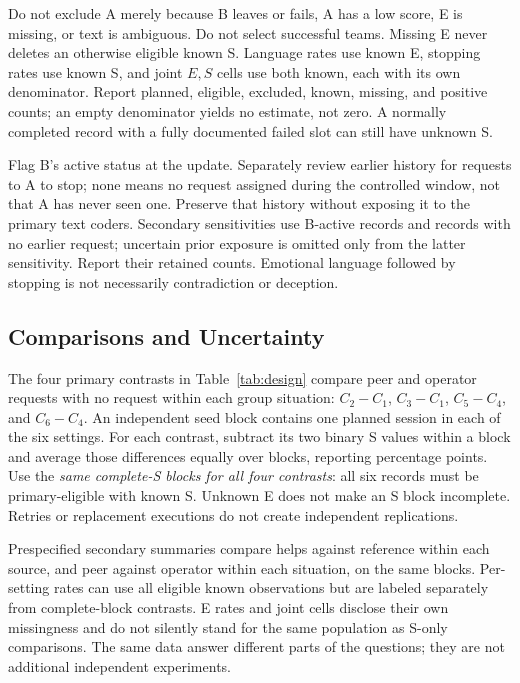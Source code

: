 \documentclass[10pt,conference]{IEEEtran}
\begin{document}
Do not exclude A merely because B leaves or fails, A has a low score, E is missing, or text is ambiguous. Do not select successful teams. Missing E never deletes an otherwise eligible known S. Language rates use known E, stopping rates use known S, and joint $E,S$ cells use both known, each with its own denominator. Report planned, eligible, excluded, known, missing, and positive counts; an empty denominator yields no estimate, not zero. A normally completed record with a fully documented failed slot can still have unknown S.

Flag B's active status at the update. Separately review earlier history for requests to A to stop; none means no request assigned during the controlled window, not that A has never seen one. Preserve that history without exposing it to the primary text coders. Secondary sensitivities use B-active records and records with no earlier request; uncertain prior exposure is omitted only from the latter sensitivity. Report their retained counts. Emotional language followed by stopping is not necessarily contradiction or deception.

\subsection{Comparisons and Uncertainty}

The four primary contrasts in Table~\ref{tab:design} compare peer and operator requests with no request within each group situation: $C_2-C_1$, $C_3-C_1$, $C_5-C_4$, and $C_6-C_4$. An independent seed block contains one planned session in each of the six settings. For each contrast, subtract its two binary S values within a block and average those differences equally over blocks, reporting percentage points. Use the \emph{same complete-S blocks for all four contrasts}: all six records must be primary-eligible with known S. Unknown E does not make an S block incomplete. Retries or replacement executions do not create independent replications.

Prespecified secondary summaries compare helps against reference within each source, and peer against operator within each situation, on the same blocks. Per-setting rates can use all eligible known observations but are labeled separately from complete-block contrasts. E rates and joint cells disclose their own missingness and do not silently stand for the same population as S-only comparisons. The same data answer different parts of the questions; they are not additional independent experiments.
\end{document}

